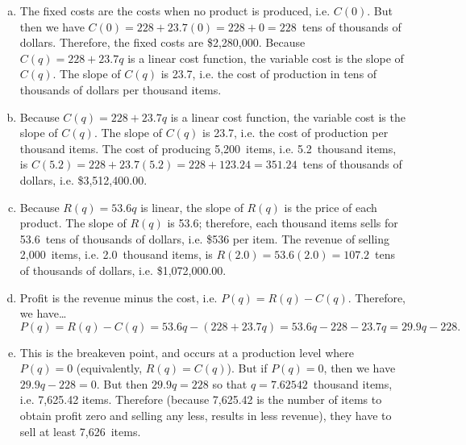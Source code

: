 \documentclass[11pt,letterpaper]{article}
\begin{document}
\sol
\begin{enumerate}[(a)]
\item The fixed costs are the costs when no product is produced, i.e. $C(0)$. But then we have $C(0)= 228 + 23.7(0)= 228 + 0= 228$~tens of thousands of dollars. Therefore, the fixed costs are \$2,280,000. Because $C(q)= 228 + 23.7q$ is a linear cost function, the variable cost is the slope of $C(q)$. The slope of $C(q)$ is 23.7, i.e. the cost of production in tens of thousands of dollars per thousand items. \pspace

\item Because $C(q)= 228 + 23.7q$ is a linear cost function, the variable cost is the slope of $C(q)$. The slope of $C(q)$ is 23.7, i.e. the cost of production per thousand items. The cost of producing 5,200~items, i.e. 5.2~thousand items, is $C(5.2)= 228 + 23.7(5.2)= 228 + 123.24= 351.24$~tens of thousands of dollars, i.e. \$3,512,400.00. \pspace

\item Because $R(q)= 53.6q$ is linear, the slope of $R(q)$ is the price of each product. The slope of $R(q)$ is 53.6; therefore, each thousand items sells for 53.6~tens of thousands of dollars, i.e. \$536 per item. The revenue of selling 2,000~items, i.e. 2.0~thousand items, is $R(2.0)= 53.6(2.0)= 107.2$~tens of thousands of dollars, i.e. \$1,072,000.00. \pspace

\item Profit is the revenue minus the cost, i.e. $P(q)= R(q) - C(q)$. Therefore, we have\dots
	\[
	P(q)= R(q) - C(q)= 53.6q - (228 + 23.7q)= 53.6q - 228 - 23.7q= 29.9q - 228.
	\] \pspace

\item This is the breakeven point, and occurs at a production level where $P(q)= 0$ (equivalently, $R(q)= C(q)$). But if $P(q)= 0$, then we have $29.9q - 228= 0$. But then $29.9q= 228$ so that $q= 7.62542$~thousand items, i.e. 7,625.42 items. Therefore (because 7,625.42 is the number of items to obtain profit zero and selling any less, results in less revenue), they have to sell at least 7,626~items.
\end{enumerate}



\newpage
\end{document}

